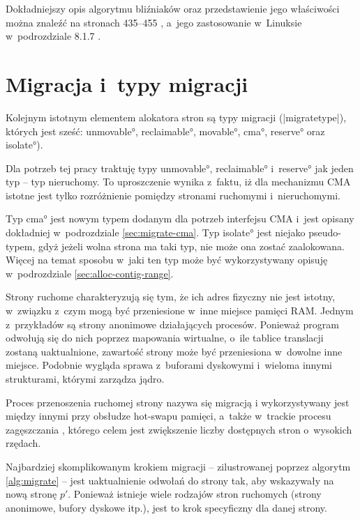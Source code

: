 Dokładniejszy opis algorytmu bliźniaków oraz przedstawienie jego
właściwości można znaleźć na stronach 435--455
\autocite{bib:taocp-fa}, a~jego zastosowanie w~Linuksie w~podrozdziale
8.1.7 \autocite{bib:utlk}.


\section{Migracja i~typy migracji}\label{sec:migratetype}

Kolejnym istotnym elementem alokatora stron są typy migracji
(\code|migratetype|), których jest sześć: \ang*{unmovable},
\ang*{reclaimable}, \ang*{movable}, \ang*{cma}, \ang*{reserve} oraz
\ang*{isolate}).

Dla potrzeb tej pracy traktuję typy \ang*{unmovable},
\ang*{reclaimable} i~\ang*{reserve} jak jeden typ -- typ nieruchomy.
To uproszczenie wynika z~faktu, iż dla mechanizmu CMA istotne jest
tylko rozróżnienie pomiędzy stronami ruchomymi i~nieruchomymi.

Typ \ang*{cma} jest nowym typem dodanym dla potrzeb interfejsu CMA
i~jest opisany dokładniej w~podrozdziale \ref{sec:migrate-cma}.  Typ
\ang*{isolate} jest niejako pseudo-typem, gdyż jeżeli wolna strona ma
taki typ, nie może ona zostać zaalokowana.  Więcej na temat sposobu
w~jaki ten typ może być wykorzystywany opisuję w~podrozdziale
\ref{sec:alloc-contig-range}.

Strony ruchome charakteryzują się tym, że ich adres fizyczny nie jest
istotny, w~związku z~czym mogą być przeniesione w~inne miejsce pamięci
RAM.  Jednym z~przykładów są strony anonimowe działających procesów.
Ponieważ program odwołują się do nich poprzez mapowania wirtualne,
o~ile tablice translacji zostaną uaktualnione, zawartość strony może
być przeniesiona w~dowolne inne miejsce.  Podobnie wygląda sprawa
z~buforami dyskowymi i~wieloma innymi strukturami, którymi zarządza
jądro.

Proces przenoszenia ruchomej strony nazywa się migracją
i wykorzystywany jest między innymi przy obsłudze hot-swapu pamięci,
a~także w~trackie procesu zagęszczania \autocite{bib:compaction,
  bib:supporting-large-contig-regions}, którego celem jest zwiększenie
liczby dostępnych stron o~wysokich rzędach.

Najbardziej skomplikowanym krokiem migracji -- zilustrowanej poprzez
algorytm \ref{alg:migrate} -- jest uaktualnienie odwołań do strony
tak, aby wskazywały na nową stronę $p'$.  Ponieważ istnieje wiele
rodzajów stron ruchomych (strony anonimowe, bufory dyskowe itp.), jest
to krok specyficzny dla danej strony.

